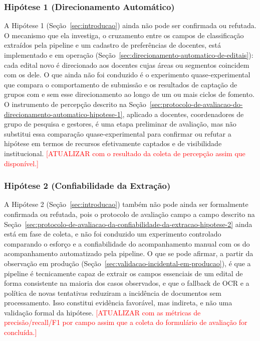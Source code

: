 \documentclass[12pt]{article}
\begin{document}
  \subsubsection{Hipótese 1 (Direcionamento Automático)}
  A Hipótese 1 (Seção~\ref{sec:introducao}) ainda não pode ser confirmada ou refutada. O mecanismo que ela investiga, o cruzamento entre os campos de classificação extraídos pela pipeline e um cadastro de preferências de docentes, está implementado e em operação (Seção~\ref{sec:direcionamento-automatico-de-editais}): cada edital novo é direcionado aos docentes cujas áreas ou segmentos coincidem com os dele. O que ainda não foi conduzido é o experimento quase-experimental que compara o comportamento de submissão e os resultados de captação de grupos com e sem esse direcionamento ao longo de um ou mais ciclos de fomento. O instrumento de percepção descrito na Seção~\ref{sec:protocolo-de-avaliacao-do-direcionamento-automatico-hipotese-1}, aplicado a docentes, coordenadores de grupo de pesquisa e gestores, é uma etapa preliminar de avaliação, mas não substitui essa comparação quase-experimental para confirmar ou refutar a hipótese em termos de recursos efetivamente captados e de visibilidade institucional. \textcolor{red}{[ATUALIZAR com o resultado da coleta de percepção assim que disponível.]}

  \subsubsection{Hipótese 2 (Confiabilidade da Extração)}
  A Hipótese 2 (Seção~\ref{sec:introducao}) também não pode ainda ser formalmente confirmada ou refutada, pois o protocolo de avaliação campo a campo descrito na Seção~\ref{sec:protocolo-de-avaliacao-da-confiabilidade-da-extracao-hipotese-2} ainda está em fase de coleta, e não foi conduzido um experimento controlado comparando o esforço e a confiabilidade do acompanhamento manual com os do acompanhamento automatizado pela pipeline. O que se pode afirmar, a partir da observação em produção (Seção~\ref{sec:validacao-incidental-em-producao}), é que a pipeline é tecnicamente capaz de extrair os campos essenciais de um edital de forma consistente na maioria dos casos observados, e que o fallback de OCR e a política de novas tentativas reduziram a incidência de documentos sem processamento. Isso constitui evidência favorável, mas indireta, e não uma validação formal da hipótese. \textcolor{red}{[ATUALIZAR com as métricas de precisão/recall/F1 por campo assim que a coleta do formulário de avaliação for concluída.]}
\end{document}
